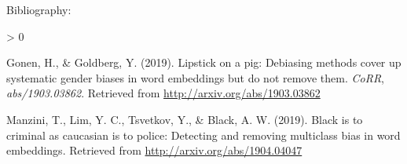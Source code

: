 \documentclass[
  12pt,
]{book}
\newlength{\cslhangindent}
\newenvironment{CSLReferences}[2] %
 {%
  \setlength{\parindent}{0pt}
  \ifodd #1 \everypar{\setlength{\hangindent}{\cslhangindent}}\ignorespaces\fi
  \ifnum #2 > 0
  \setlength{\parskip}{#2\baselineskip}
  \fi
 }%
 {}
\begin{document}
Bibliography:

\hypertarget{refs}{}
\begin{CSLReferences}{1}{0}
\leavevmode\hypertarget{ref-Gonen2019Lipstick}{}%
Gonen, H., \& Goldberg, Y. (2019). Lipstick on a pig: Debiasing methods cover up systematic gender biases in word embeddings but do not remove them. \emph{CoRR}, \emph{abs/1903.03862}. Retrieved from \url{http://arxiv.org/abs/1903.03862}

\leavevmode\hypertarget{ref-Manzini2019blackToCriminal}{}%
Manzini, T., Lim, Y. C., Tsvetkov, Y., \& Black, A. W. (2019). Black is to criminal as caucasian is to police: Detecting and removing multiclass bias in word embeddings. Retrieved from \url{http://arxiv.org/abs/1904.04047}

\end{CSLReferences}
\end{document}
